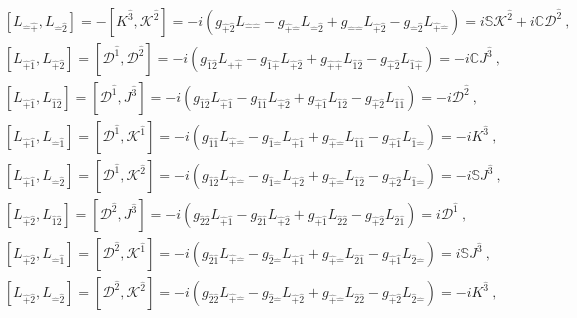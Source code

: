 \documentclass[12pt,a4paper]{report}
\begin{document}
    \begin{align*}
    &\left[L_{\hat{-}\hat{+}},L_{\hat{-}\hat{2}}\right]=-\left[K^{\hat{3}},\mathcal{K}^{\hat{2}}\right]=-i\left(g_{\hat{+}\hat{2}}L_{\hat{-}\hat{-}}-g_{\hat{+}\hat{-}}L_{\hat{-}\hat{2}}+g_{\hat{-}\hat{-}}L_{\hat{+}\hat{2}}-g_{\hat{-}\hat{2}}L_{\hat{+}\hat{-}}\right)=i\mathbb{S}\mathcal{K}^{\hat{2}}+i\mathbb{C}\mathcal{D}^{\hat{2}}~,\\
    &\left[L_{\hat{+}\hat{1}},L_{\hat{+}\hat{2}}\right]=\left[\mathcal{D}^{\hat{1}},\mathcal{D}^{\hat{2}}\right]=-i\left(g_{\hat{1}\hat{2}}L_{\hat{+}\hat{+}}-g_{\hat{1}\hat{+}}L_{\hat{+}\hat{2}}+g_{\hat{+}\hat{+}}L_{\hat{1}\hat{2}}-g_{\hat{+}\hat{2}}L_{\hat{1}\hat{+}}\right)=-i\mathbb{C}J^{\hat{3}}~,\\
    &\left[L_{\hat{+}\hat{1}},L_{\hat{1}\hat{2}}\right]=\left[\mathcal{D}^{\hat{1}},J^{\hat{3}}\right]=-i\left(g_{\hat{1}\hat{2}}L_{\hat{+}\hat{1}}-g_{\hat{1}\hat{1}}L_{\hat{+}\hat{2}}+g_{\hat{+}\hat{1}}L_{\hat{1}\hat{2}}-g_{\hat{+}\hat{2}}L_{\hat{1}\hat{1}}\right)=-i\mathcal{D}^{\hat{2}}~,\\
    &\left[L_{\hat{+}\hat{1}},L_{\hat{-}\hat{1}}\right]=\left[\mathcal{D}^{\hat{1}},\mathcal{K}^{\hat{1}}\right]=-i\left(g_{\hat{1}\hat{1}}L_{\hat{+}\hat{-}}-g_{\hat{1}\hat{-}}L_{\hat{+}\hat{1}}+g_{\hat{+}\hat{-}}L_{\hat{1}\hat{1}}-g_{\hat{+}\hat{1}}L_{\hat{1}\hat{-}}\right)=-iK^{\hat{3}}~,\\
    &\left[L_{\hat{+}\hat{1}},L_{\hat{-}\hat{2}}\right]=\left[\mathcal{D}^{\hat{1}},\mathcal{K}^{\hat{2}}\right]=-i\left(g_{\hat{1}\hat{2}}L_{\hat{+}\hat{-}}-g_{\hat{1}\hat{-}}L_{\hat{+}\hat{2}}+g_{\hat{+}\hat{-}}L_{\hat{1}\hat{2}}-g_{\hat{+}\hat{2}}L_{\hat{1}\hat{-}}\right)=-i\mathbb{S}J^{\hat{3}}~,\\
    &\left[L_{\hat{+}\hat{2}},L_{\hat{1}\hat{2}}\right]=\left[\mathcal{D}^{\hat{2}},J^{\hat{3}}\right]=-i\left(g_{\hat{2}\hat{2}}L_{\hat{+}\hat{1}}-g_{\hat{2}\hat{1}}L_{\hat{+}\hat{2}}+g_{\hat{+}\hat{1}}L_{\hat{2}\hat{2}}-g_{\hat{+}\hat{2}}L_{\hat{2}\hat{1}}\right)=i\mathcal{D}^{\hat{1}}~,\\
    &\left[L_{\hat{+}\hat{2}},L_{\hat{-}\hat{1}}\right]=\left[\mathcal{D}^{\hat{2}},\mathcal{K}^{\hat{1}}\right]=-i\left(g_{\hat{2}\hat{1}}L_{\hat{+}\hat{-}}-g_{\hat{2}\hat{-}}L_{\hat{+}\hat{1}}+g_{\hat{+}\hat{-}}L_{\hat{2}\hat{1}}-g_{\hat{+}\hat{1}}L_{\hat{2}\hat{-}}\right)=i\mathbb{S}J^{\hat{3}}~,\\
    &\left[L_{\hat{+}\hat{2}},L_{\hat{-}\hat{2}}\right]=\left[\mathcal{D}^{\hat{2}},\mathcal{K}^{\hat{2}}\right]=-i\left(g_{\hat{2}\hat{2}}L_{\hat{+}\hat{-}}-g_{\hat{2}\hat{-}}L_{\hat{+}\hat{2}}+g_{\hat{+}\hat{-}}L_{\hat{2}\hat{2}}-g_{\hat{+}\hat{2}}L_{\hat{2}\hat{-}}\right)=-iK^{\hat{3}}~,\\

\end{align*}
\end{document}
